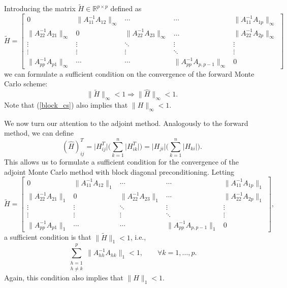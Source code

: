 \documentclass[final,leqno,onefignum,onetabnum]{siamltex1213}
\begin{document}
Introducing the matrix $\tilde{H}\in \mathbb{R}^{p\times p}$ defined as
\[
 \tilde{H}=\begin{bmatrix}0 & \lVert A_{11}^{-1}A_{12}\rVert_{\infty} &
\cdots &
\cdots & \lVert A_{11}^{-1}A_{1p}\rVert_{\infty} \\
\lVert A_{22}^{-1}A_{21}\rVert_{\infty} & 0 & \lVert
A_{22}^{-1}A_{23}\rVert_{\infty} &
\dots & \lVert A_{22}^{-1}A_{2p}\rVert_{\infty} \\
\vdots & \vdots & \ddots & \vdots & \vdots\\
\vdots & \vdots & \vdots &\ddots & \vdots \\
\lVert A_{pp}^{-1}A_{p1}\rVert_{\infty} &  \cdots & \cdots&
\lVert A_{pp}^{-1}A_{p,p-1}\rVert_{\infty} & 0
\end{bmatrix}
\]
we can formulate a
sufficient condition on the convergence of the forward Monte
Carlo scheme:
\begin{equation}
 \lVert \tilde{H} \rVert_{\infty}<1 \Rightarrow \lVert \hat{H}
\rVert_{\infty}<1.
\end{equation}
Note that (\ref{block_cs}) also implies that $\|H\|_{\infty} < 1$. 

We now turn our attention to the adjoint method.
Analogously to the forward method, we can define
\[
(\hat{H})^T_{ij} = \lvert H^T_{ij}\rvert\bigg(\sum_{k=1}^n\lvert
H^T_{ik}\rvert\bigg) = \lvert H_{ji}\rvert\bigg(\sum_{k=1}^n\lvert
H_{ki}\rvert\bigg).
\]
This allows us to formulate a sufficient condition for the convergence of 
the adjoint Monte Carlo method with block diagonal preconditioning.
Letting
\[
  \tilde{H}=\begin{bmatrix}0 & \lVert A_{11}^{-1}A_{12}\rVert_{1} & \cdots
&
\cdots & \lVert A_{11}^{-1}A_{1p}\rVert_{1} \\
\lVert A_{22}^{-1}A_{21}\rVert_{1} & 0 & \lVert
A_{22}^{-1}A_{23}\rVert_{1} &
\cdots & \lVert A_{22}^{-1}A_{2p}\rVert_{1} \\
\vdots & \vdots & \ddots & \vdots & \vdots\\
\vdots & \vdots & \vdots &\ddots & \vdots \\
\lVert A_{pp}^{-1}A_{p1}\rVert_{1} &  \cdots & \cdots&
\lVert A_{pp}^{-1}A_{p,p-1}\rVert_{1} & 0
\end{bmatrix},
\]
a sufficient condition is that $\lVert \tilde{H} \rVert_{1}<1$, i.e.,
 \begin{equation}
  \sum_{\substack{h=1\\h\ne k}}^p \lVert A_{hh}^{-1}A_{hk}\rVert_1<1,
    \label{block_cs_2}\qquad \forall k=1,\ldots,p.
 \end{equation}
Again, this condition also implies that $\|H\|_1 < 1$.
\end{document}
